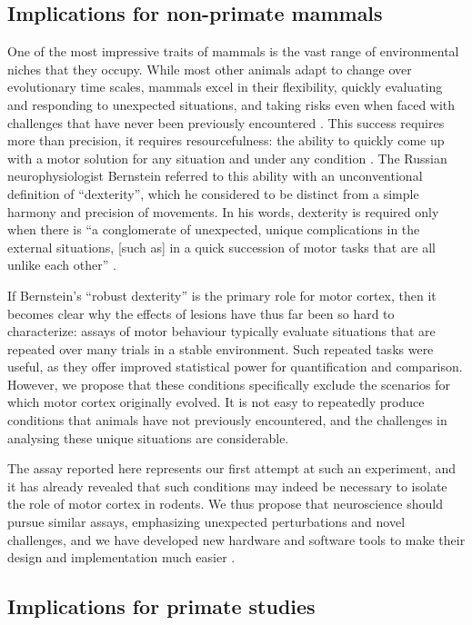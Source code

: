 \subsection{Implications for non-primate mammals}

One of the most impressive traits of mammals is the vast range of environmental niches that they occupy. While most other animals adapt to change over evolutionary time scales, mammals excel in their flexibility, quickly evaluating and responding to unexpected situations, and taking risks even when faced with challenges that have never been previously encountered \citep{Spinka2001}. This success requires more than precision, it requires resourcefulness: the ability to quickly come up with a motor solution for any situation and under any condition \citep{Bernstein1996}. The Russian neurophysiologist Bernstein referred to this ability with an unconventional definition of ``dexterity'', which he considered to be distinct from a simple harmony and precision of movements. In his words, dexterity is required only when there is \enquote{a conglomerate of unexpected, unique complications in the external situations, [such as] in a quick succession of motor tasks that are all unlike each other} \citep{Bernstein1996}.

If Bernstein’s ``robust dexterity'' is the primary role for motor cortex, then it becomes clear why the effects of lesions have thus far been so hard to characterize: assays of motor behaviour typically evaluate situations that are repeated over many trials in a stable environment. Such repeated tasks were useful, as they offer improved statistical power for quantification and comparison. However, we propose that these conditions specifically exclude the scenarios for which motor cortex originally evolved. It is not easy to repeatedly produce conditions that animals have not previously encountered, and the challenges in analysing these unique situations are considerable.

The assay reported here represents our first attempt at such an experiment, and it has already revealed that such conditions may indeed be necessary to isolate the role of motor cortex in rodents. We thus propose that neuroscience should pursue similar assays, emphasizing unexpected perturbations and novel challenges, and we have developed new hardware and software tools to make their design and implementation much easier \citep{Lopes2015a}.

\subsection{Implications for primate studies}

